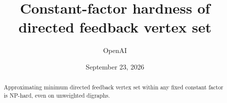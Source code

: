 \documentclass[11pt]{article}
\title{Constant-factor hardness of\\directed feedback vertex set}
\author{OpenAI}
\date{September 23, 2026}
\theoremstyle{definition}
\theoremstyle{remark}
\numberwithin{equation}{section}
\begin{document}
\maketitle
\begin{abstract}
Approximating minimum directed feedback vertex set within any fixed
constant factor is NP-hard, even on unweighted digraphs.
\end{abstract}
\tableofcontents









\par
\begingroup
\small

\endgroup
\end{document}
